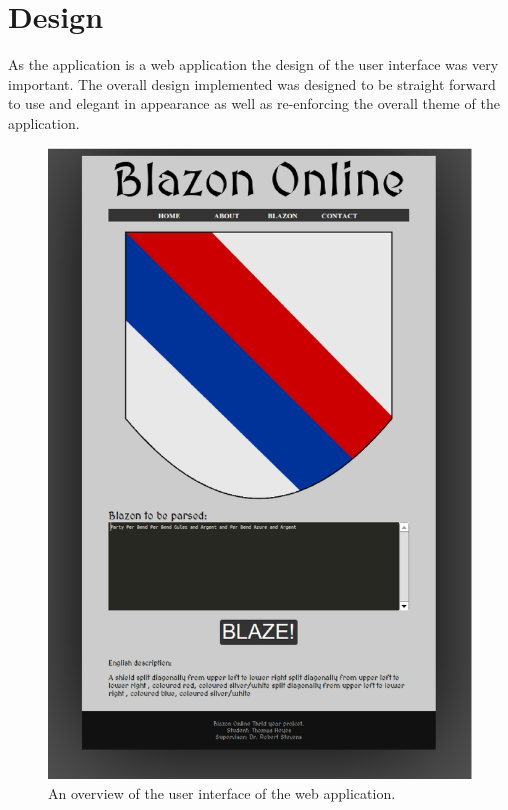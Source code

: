 \chapter{Design}

As the application is a web application the design of the user interface was very important.  The overall design implemented was designed to be straight forward to use and elegant in appearance as well as re-enforcing the overall theme of the application.  

\begin{figure}[H]
  \centering
    \includegraphics[width=\textwidth]{design/images/overall.eps}
  \caption{An overview of the user interface of the web application.}
  \label{fig:overall}
  
\end{figure}

